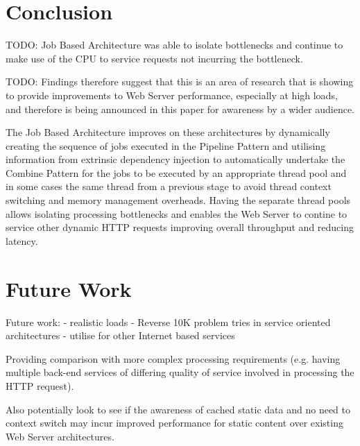 \documentclass[conference]{ieee/IEEEtran}
\begin{document}



\section{Conclusion}
TODO: Job Based Architecture was able to isolate bottlenecks and continue to
make use of the CPU to service requests not incurring the bottleneck.

TODO: Findings therefore suggest that this is an area of research that is
showing to provide improvements to Web Server performance, especially at high
loads, and therefore is being announced in this paper for awareness by a wider
audience.

The Job Based Architecture improves on these architectures by dynamically
creating the sequence of jobs executed in the Pipeline Pattern and utilising
information from extrinsic dependency injection to automatically undertake the
Combine Pattern for the jobs to be executed by an appropriate thread pool and
in some cases the same thread from a previous stage to avoid thread context
switching and memory management overheads.  Having the separate thread pools
allows isolating processing bottlenecks and enables the Web Server to contine
to service other dynamic HTTP requests improving overall throughput and
reducing latency.




\section{Future Work}

Future work:
 - realistic loads
 - Reverse 10K problem tries in service oriented architectures
 - utilise for other Internet based services


Providing comparison with more complex processing requirements (e.g. having
multiple back-end services of differing quality of service involved in
processing the HTTP request).

Also potentially look to see if the awareness of cached static data and no need
to context switch may incur improved performance for static content over
existing Web Server architectures.
\end{document}

